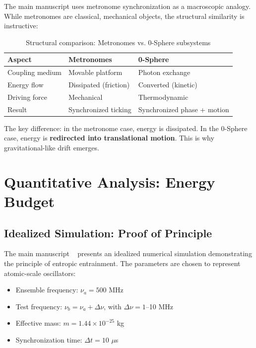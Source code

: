 \documentclass[12pt,letterpaper]{article}
\begin{document}
The main manuscript uses metronome synchronization as a macroscopic analogy. While metronomes are classical, mechanical objects, the structural similarity is instructive:

\begin{table}[h!]
\centering
\caption{Structural comparison: Metronomes vs. 0-Sphere subsystems}
\begin{tabular}{lll}
\toprule
\textbf{Aspect} & \textbf{Metronomes} & \textbf{0-Sphere} \\
\midrule
Coupling medium & Movable platform & Photon exchange \\
Energy flow & Dissipated (friction) & Converted (kinetic) \\
Driving force & Mechanical & Thermodynamic \\
Result & Synchronized ticking & Synchronized phase + motion \\
\bottomrule
\end{tabular}
\end{table}

The key difference: in the metronome case, energy is dissipated. In the 0-Sphere case, energy is \textbf{redirected into translational motion}. This is why gravitational-like drift emerges.



\section{Quantitative Analysis: Energy Budget}
\label{sec:quantitative}

\justifying

\subsection{Idealized Simulation: Proof of Principle}
\label{subsec:idealized_simulation}

The main manuscript ~\cite{Hanamura2026geometrical} presents an idealized numerical simulation demonstrating the principle of entropic entrainment. The parameters are chosen to represent atomic-scale oscillators:
\begin{itemize}
\item Ensemble frequency: $\nu_a = 500$ MHz
\item Test frequency: $\nu_b = \nu_a + \Delta\nu$, with $\Delta\nu = 1$--10 MHz
\item Effective mass: $m = 1.44 \times 10^{-25}$ kg
\item Synchronization time: $\Delta t = 10$ $\mu$s
\end{itemize}
\end{document}
